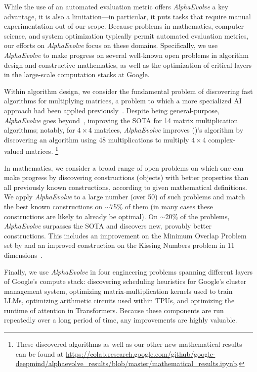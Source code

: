 \documentclass[logo,copyright,12pt]{googledeepmind}
\newcommand\authoryearcitet[1]{%
  \citeauthor{#1} (\citeyear{#1})}
\theoremstyle{definition}
\theoremstyle{remark}
\theoremstyle{plain}
\newcommand{\ResultsColabURL}{https://colab.research.google.com/github/google-deepmind/alphaevolve\_results/blob/master/mathematical\_results.ipynb}
\newcommand{\method}{\emph{AlphaEvolve}\xspace}
\begin{document}
While the use of an automated evaluation metric offers \method a key advantage, it is also a limitation---in particular, it puts tasks that require manual experimentation out of our scope. 
Because problems in mathematics, computer science, and system optimization typically permit automated evaluation metrics, our efforts on \method focus on these domains.
Specifically, we use \method to make progress on several well-known open problems in algorithm design and constructive mathematics, as well as the optimization of critical layers in the large-scale computation stacks at Google.

Within algorithm design, we consider the fundamental problem of discovering fast algorithms for multiplying matrices, a problem to which a more specialized AI approach had been applied previously~\citep{fawzi2022discovering}.
Despite being general-purpose, \method goes beyond~\cite{fawzi2022discovering}, improving the SOTA for 14 matrix multiplication algorithms; notably, for $4 \times 4$ matrices, \method improves \authoryearcitet{strassen1969gaussian}'s algorithm by discovering an algorithm using 48 multiplications to multiply $4 \times 4$ complex-valued matrices.%
\footnote{These discovered algorithms as well as our other new mathematical results can be found at \url{\ResultsColabURL}.}

In mathematics, we consider a broad range of open problems on which one can make progress by discovering constructions (objects) with better properties than all previously known constructions, according to given mathematical definitions.
We apply \method to a large number (over 50) of such problems and match the best known constructions on $\sim$75\% of them (in many cases these constructions are likely to already be optimal). On $\sim$20\% of the problems, \method surpasses the SOTA and discovers new, provably  better constructions.
This includes an improvement on the Minimum Overlap Problem set by \citet{erdHos1955some} and an improved construction on the Kissing Numbers problem in $11$ dimensions~\citep{kissing_survey,kissing_11}.

Finally, we use \method in four engineering problems spanning different layers of Google's compute stack: discovering scheduling heuristics for Google's cluster management system, optimizing matrix-multiplication kernels used to train LLMs, optimizing arithmetic circuits used within TPUs, and optimizing the runtime of attention in Transformers.
Because these components are run repeatedly over a long period of time, any improvements are highly valuable.
\end{document}
